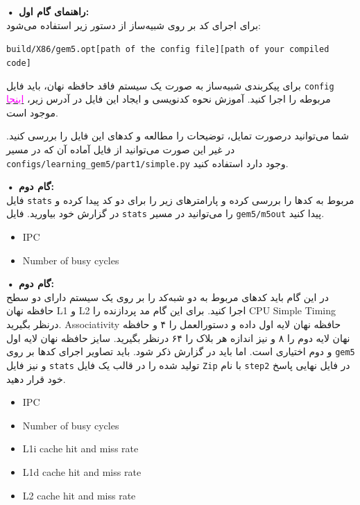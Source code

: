 \documentclass[12pt]{exam}
\begin{document}
\textbf{• راهنمای گام اول: }\\
برای اجرای کد بر روی شبیه‌ساز از دستور زیر استفاده می‌شود:

\begin{latin}
	\texttt{build/X86/‫‪gem5.opt‬‬[‫‪path of the config file][‫‪path of your compiled code]}
\end{latin}

برای پیکربندی شبیه‌ساز به صورت یک سیستم فاقد حافظه نهان، باید فایل \texttt{config} مربوطه را اجرا کنید. آموزش نحوه کدنویسی و ایجاد این فایل در آدرس زیر، \href{https://www.gem5.org/documentation/learning_gem5/part1/simple_config/}{\textcolor{magenta}{اینجا}} موجود است.

شما می‌توانید درصورت تمایل، توضیحات را مطالعه و کد‌های این فایل را بررسی کنید. در غیر این صورت می‌توانید از فایل آماده آن که در مسیر \texttt{configs/learning\_gem5/part1/simple.py}
وجود دارد استفاده کنید.






\textbf{• گام دوم: }\\
فایل \texttt{stats} مربوط به کد‌ها را بررسی کرده و پارامتر‌های زیر را برای دو کد پیدا کرده و در گزارش خود بیاورید. فایل \texttt{stats} را می‌توانید در مسیر \texttt{gem5/m5out} پیدا کنید.
\begin{latin}
	\begin{itemize}
		\item IPC
		\item Number of busy cycles
	\end{itemize}
\end{latin}







\textbf{• گام دوم: }\\
در این گام باید کد‌های مربوط به دو شبه‌کد را بر روی یک سیستم دارای دو سطح حافظه نهان  L1 و L2 اجرا کنید. برای این گام مد پردازنده را CPU Simple Timing درنظر بگیرید. Associativity حافظه نهان لایه اول داده و دستور‌العمل را ۴ و حافظه نهان لایه دوم را ۸ و نیز اندازه هر بلاک را ۶۴ درنظر بگیرید. سایز حافظه نهان لایه اول و دوم اختیاری است. اما باید در گزارش ذکر شود. باید تصاویر اجرای کدها بر روی \texttt{gem5} و نیز فایل \texttt{stats} تولید شده را در قالب یک فایل \texttt{Zip} با نام \texttt{step2} در فایل نهایی پاسخ خود قرار دهید.
\begin{latin}
	\begin{itemize}
		\item IPC
		\item Number of busy cycles
		\item L1i cache hit and miss rate
		\item L1d cache hit and miss rate
		\item L2 cache hit and miss rate
	\end{itemize}
\end{latin}
\end{document}
